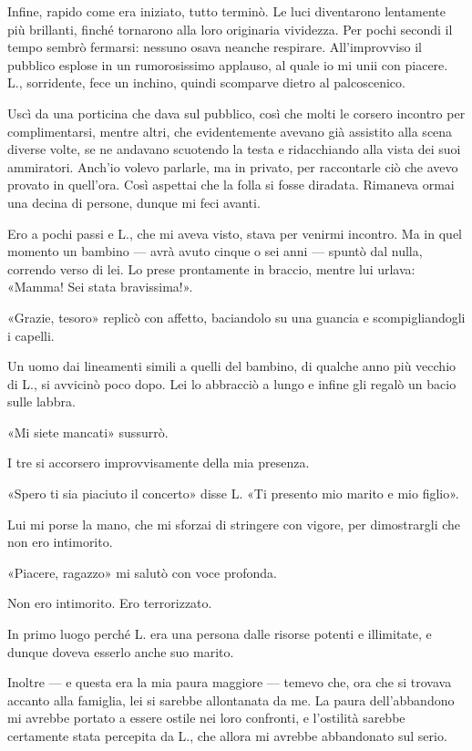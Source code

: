 \documentclass[a4paper,10pt]{memoir}
\begin{document}
Infine, rapido come era iniziato, tutto terminò. Le luci diventarono lentamente più brillanti, finché tornarono alla
loro originaria vividezza. Per pochi secondi il tempo sembrò fermarsi: nessuno osava neanche respirare. All'improvviso
il pubblico esplose in un rumorosissimo applauso, al quale io mi unii con piacere. L., sorridente, fece un inchino,
quindi scomparve dietro al palcoscenico.

Uscì da una porticina che dava sul pubblico, così che molti le corsero incontro per complimentarsi, mentre altri, che
evidentemente avevano già assistito alla scena diverse volte, se ne andavano scuotendo la testa e ridacchiando alla
vista dei suoi ammiratori. Anch'io volevo parlarle, ma in privato, per raccontarle ciò che avevo provato in quell'ora.
Così aspettai che la folla si fosse diradata. Rimaneva ormai una decina di persone, dunque mi feci avanti.

Ero a pochi passi e L., che mi aveva visto, stava per venirmi incontro. Ma in quel momento un bambino --- avrà avuto
cinque o sei anni --- spuntò dal nulla, correndo verso di lei. Lo prese prontamente in braccio, mentre lui urlava:
«Mamma! Sei stata bravissima!».

«Grazie, tesoro» replicò con affetto, baciandolo su una guancia e scompigliandogli i capelli.

Un uomo dai lineamenti simili a quelli del bambino, di qualche anno più vecchio di L., si avvicinò poco dopo. Lei lo
abbracciò a lungo e infine gli regalò un bacio sulle labbra.

«Mi siete mancati» sussurrò.

I tre si accorsero improvvisamente della mia presenza.

«Spero ti sia piaciuto il concerto» disse L. «Ti presento mio marito e mio figlio».

Lui mi porse la mano, che mi sforzai di stringere con vigore, per dimostrargli che non ero intimorito.

«Piacere, ragazzo» mi salutò con voce profonda.

Non ero intimorito. Ero terrorizzato.

In primo luogo perché L. era una persona dalle risorse potenti e illimitate, e dunque doveva esserlo anche suo marito.

Inoltre --- e questa era la mia paura maggiore --- temevo che, ora che si trovava accanto alla famiglia, lei si sarebbe
allontanata da me. La paura dell'abbandono mi avrebbe portato a essere ostile nei loro confronti, e l'ostilità sarebbe
certamente stata percepita da L., che allora mi avrebbe abbandonato sul serio.
\end{document}

